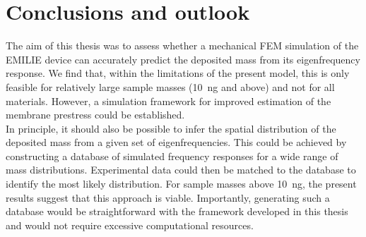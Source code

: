 \section{Conclusions and outlook}

The aim of this thesis was to assess whether a mechanical FEM simulation of the EMILIE device can accurately predict the deposited mass from its eigenfrequency response. We find that, within the limitations of the present model, this is only feasible for relatively large sample masses (\SI{10}{\nano\gram} and above) and not for all materials. However, a simulation framework for improved estimation of the membrane prestress could be established.\\
In principle, it should also be possible to infer the spatial distribution of the deposited mass from a given set of eigenfrequencies. This could be achieved by constructing a database of simulated frequency responses for a wide range of mass distributions. Experimental data could then be matched to the database to identify the most likely distribution. For sample masses above \SI{10}{\nano\gram}, the present results suggest that this approach is viable. Importantly, generating such a database would be straightforward with the framework developed in this thesis and would not require excessive computational resources.\\

\newpage